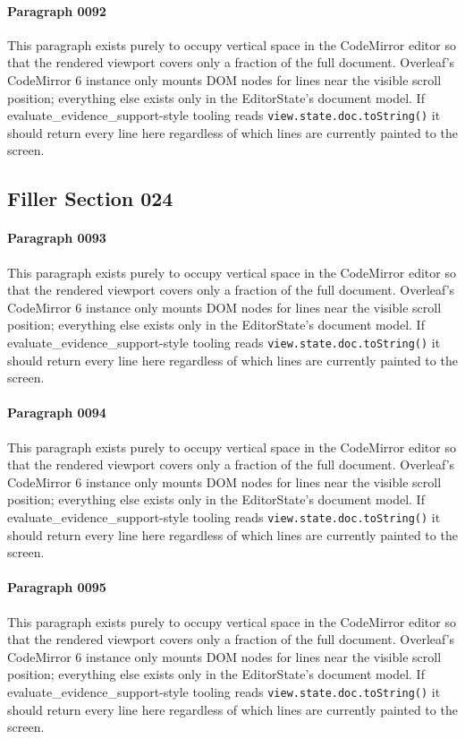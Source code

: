 \documentclass{article}
\begin{document}
\paragraph{Paragraph 0092}
This paragraph exists purely to occupy vertical space in the CodeMirror editor so that the rendered viewport covers only a fraction of the full document. Overleaf's CodeMirror 6 instance only mounts DOM nodes for lines near the visible scroll position; everything else exists only in the EditorState's document model. If evaluate\_evidence\_support-style tooling reads \texttt{view.state.doc.toString()} it should return every line here regardless of which lines are currently painted to the screen.

\subsection{Filler Section 024}
\paragraph{Paragraph 0093}
This paragraph exists purely to occupy vertical space in the CodeMirror editor so that the rendered viewport covers only a fraction of the full document. Overleaf's CodeMirror 6 instance only mounts DOM nodes for lines near the visible scroll position; everything else exists only in the EditorState's document model. If evaluate\_evidence\_support-style tooling reads \texttt{view.state.doc.toString()} it should return every line here regardless of which lines are currently painted to the screen.

\paragraph{Paragraph 0094}
This paragraph exists purely to occupy vertical space in the CodeMirror editor so that the rendered viewport covers only a fraction of the full document. Overleaf's CodeMirror 6 instance only mounts DOM nodes for lines near the visible scroll position; everything else exists only in the EditorState's document model. If evaluate\_evidence\_support-style tooling reads \texttt{view.state.doc.toString()} it should return every line here regardless of which lines are currently painted to the screen.

\paragraph{Paragraph 0095}
This paragraph exists purely to occupy vertical space in the CodeMirror editor so that the rendered viewport covers only a fraction of the full document. Overleaf's CodeMirror 6 instance only mounts DOM nodes for lines near the visible scroll position; everything else exists only in the EditorState's document model. If evaluate\_evidence\_support-style tooling reads \texttt{view.state.doc.toString()} it should return every line here regardless of which lines are currently painted to the screen.
\end{document}
